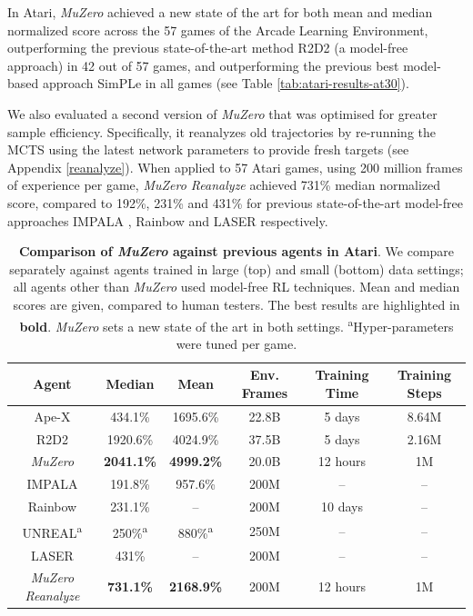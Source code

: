 \documentclass{article}
\newcommand{\muzero}{\emph{MuZero}}
\newcommand{\reanalyze}{\emph{MuZero Reanalyze}}
\begin{document}
In Atari, \muzero{} achieved a new state of the art for both mean and median normalized score across the 57 games of the Arcade Learning Environment, outperforming the previous state-of-the-art method R2D2 \cite{r2d2} (a model-free approach) in 42 out of 57 games, and outperforming the previous best model-based approach SimPLe \cite{kaiser:simple} in all games (see Table \ref{tab:atari-results-at30}).

We also evaluated a second version of \muzero{} that was optimised for greater sample efficiency. Specifically, it reanalyzes old trajectories by re-running the MCTS using the latest network parameters to provide fresh targets (see Appendix \ref{reanalyze}). When applied to 57 Atari games, using 200 million frames of experience per game, \reanalyze{} achieved 731\% median normalized score, compared to 192\%, 231\% and 431\% for previous state-of-the-art model-free approaches IMPALA \cite{impala}, Rainbow \cite{rainbow} and LASER \cite{laser} respectively.

\begin{table}

\begin{tabularx}{\textwidth}{c c c c c c}

\toprule
Agent &   Median &     Mean & Env. Frames & Training Time & Training Steps \\
\midrule
Ape-X \cite{apex} &  434.1\% & 1695.6\% & 22.8B & 5 days & 8.64M\\
R2D2 \cite{r2d2} & 1920.6\% & 4024.9\% & 37.5B & 5 days & 2.16M \\
\muzero{} & \textbf{2041.1\%
} & \textbf{4999.2\%
} & 20.0B & 12 hours & 1M \\
\midrule
IMPALA \cite{impala}  & 191.8\% & 957.6\% & 200M & -- & -- \\
Rainbow \cite{rainbow} &  231.1\% & -- & 200M & 10 days & -- \\
UNREAL\textsuperscript{a} \cite{unreal} & 250\%\textsuperscript{a} & 880\%\textsuperscript{a} & 250M & -- & -- \\
LASER \cite{laser} & 431\% & -- & 200M & -- & -- \\
\reanalyze{} & \textbf{731.1\%} & \textbf{2168.9\%} & 200M & 12 hours & 1M \\
\bottomrule
\end{tabularx}

\caption{
\label{tab:atari-comparison}
\textbf{Comparison of \muzero{} against previous agents in Atari}. We compare separately against agents trained in large (top) and small (bottom) data settings; all agents other than \muzero{} used model-free RL techniques. Mean and median scores are given, compared to human testers. The best results are highlighted in \textbf{bold}. \muzero{} sets a new state of the art in both settings. \textsuperscript{a}Hyper-parameters were tuned per game.
}
\end{table}
\end{document}
